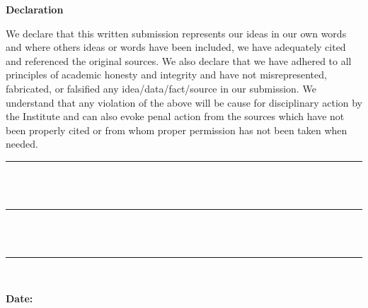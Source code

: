 
\thispagestyle{empty}
\begin{center}
    {\Large \textbf{Declaration}}
\end{center}

\vspace{0.5cm}

\justifying

We declare that this written submission represents our ideas in our own
words and where others ideas or words have been included, we have adequately
cited and referenced the original sources. We also declare that we have adhered to
all principles of academic honesty and integrity and have not misrepresented,
fabricated, or falsified any idea/data/fact/source in our submission. We understand
that any violation of the above will be cause for disciplinary action by the Institute
and can also evoke penal action from the sources which have not been properly
cited or from whom proper permission has not been taken when needed.

\vspace{2cm}

\begin{flushright}
    \rule{6cm}{0.5pt} \\[-0.4cm]
    \makebox[6cm]{\textbf{\AuthorOne}} \\[0.5cm]
    \rule{6cm}{0.5pt} \\[-0.4cm]
    \makebox[6cm]{\textbf{\AuthorTwo}} \\[0.5cm]
    \rule{6cm}{0.5pt} \\[-0.4cm]
    \makebox[6cm]{\textbf{\AuthorThree}}
\end{flushright}

\vfill

\noindent\textbf{Date:}\par\vspace{2em}

\clearpage
